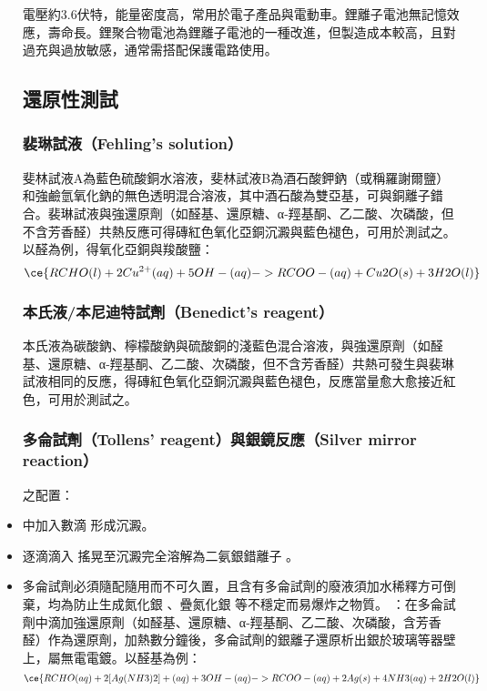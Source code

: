 \documentclass[a4paper,12pt]{report}
\begin{document}
\begin{itemize}
電壓約3.6伏特，能量密度高，常用於電子產品與電動車。鋰離子電池無記憶效應，壽命長。鋰聚合物電池為鋰離子電池的一種改進，但製造成本較高，且對過充與過放敏感，通常需搭配保護電路使用。
\subsection{還原性測試}
\subsubsection{裴琳試液（Fehling's solution）}
斐林試液A為藍色硫酸銅水溶液，斐林試液B為酒石酸鉀鈉（或稱羅謝爾鹽）和強鹼氫氧化鈉的無色透明混合溶液，其中酒石酸為雙亞基，可與銅離子錯合。裴琳試液與強還原劑（如醛基、還原糖、α-羥基酮、乙二酸、次磷酸，但不含芳香醛）共熱反應可得磚紅色氧化亞銅沉澱與藍色褪色，可用於測試之。以醛為例，得氧化亞銅與羧酸鹽：
\[\ce{RCHO(l) + 2Cu^{2+}(aq) + 5OH-(aq) -> RCOO-(aq) + Cu2O(s) + 3H2O(l)}\]
\subsubsection{本氏液/本尼迪特試劑（Benedict's reagent）}
本氏液為碳酸鈉、檸檬酸鈉與硫酸銅的淺藍色混合溶液，與強還原劑（如醛基、還原糖、α-羥基酮、乙二酸、次磷酸，但不含芳香醛）共熱可發生與裴琳試液相同的反應，得磚紅色氧化亞銅沉澱與藍色褪色，反應當量愈大愈接近紅色，可用於測試之。
\subsubsection{多侖試劑（Tollens' reagent）與銀鏡反應（Silver mirror reaction）}
之配置：
\ben
\item {} 中加入數滴  形成沉澱。
\item 逐滴滴入  搖晃至沉澱完全溶解為二氨銀錯離子 \ce{[Ag(NH3)2]+}。
\item 多侖試劑必須隨配隨用而不可久置，且含有多侖試劑的廢液須加水稀釋方可倒棄，均為防止生成氮化銀  、疊氮化銀  等不穩定而易爆炸之物質。
\een
{}：在多侖試劑中滴加強還原劑（如醛基、還原糖、α-羥基酮、乙二酸、次磷酸，含芳香醛）作為還原劑，加熱數分鐘後，多侖試劑的銀離子還原析出銀於玻璃等器壁上，屬無電電鍍。以醛基為例：
\[\ce{RCHO(aq) + 2[Ag(NH3)2]+(aq) + 3OH-(aq) -> RCOO-(aq) + 2Ag(s) + 4NH3(aq) + 2H2O(l)}\]

\end{itemize}
\end{document}
